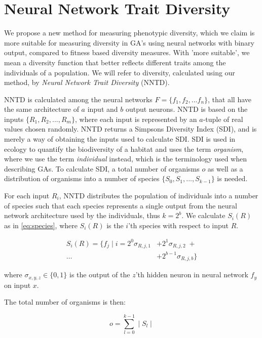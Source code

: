 \section{Neural Network Trait Diversity}
We propose a new method for measuring phenotypic diversity, which we claim is more suitable for measuring diversity in GA's using neural networks with binary output, compared to fitness based diversity measures. With 'more suitable', we mean a diversity function that better reflects different traits among the individuals of a population. We will refer to diversity, calculated using our method, by \emph{Neural Network Trait Diversity} (NNTD).

NNTD is calculated among the neural networks $F = \{f_1, f_2, ... f_n\}$, that all have the same architecture of $a$ input and $b$ output neurons. NNTD is based on the inputs $\{R_1, R_2, ..., R_m\}$, where each input is represented by an $a$-tuple of real values chosen randomly. NNTD returns a Simpsons Diversity Index (SDI), and is merely a way of obtaining the inputs used to calculate SDI. SDI is used in ecology to quantify the biodiversity of a habitat and uses the term \emph{organism}, where we use the term \emph{individual} instead, which is the terminology used when describing GAs. To calculate SDI, a total number of organisms $o$ as well as a distribution of organisms into a number of species $\{S_0, S_1, ..., S_{k-1}\}$ is needed.

For each input $R_i$, NNTD distributes the population of individuals into a number of species such that each species represents a single output from the neural network architecture used by the individuals, thus $k = 2^b$. We calculate $S_i(R)$ as in \cref{eq:species}, where $S_i(R)$ is the $i$'th species with respect to input $R$.

\begin{equation}\label{eq:species}
  \begin{split}
    S_i(R) = \{f_j \mid i = 2^0\sigma_{R,j,1} & + 2^1\sigma_{R,j,2}\; + \\
  \ldots & + 2^{b-1}\sigma_{R,j,b} \}
  \end{split}
\end{equation}

where $\sigma_{x,y,z} \in \{0, 1\}$ is the output of the $z$'th hidden neuron in neural network $f_y$ on input $x$.

The total number of organisms is then:

\[o = \sum\limits_{l = 0}^{k-1} \mid S_l \mid\]

